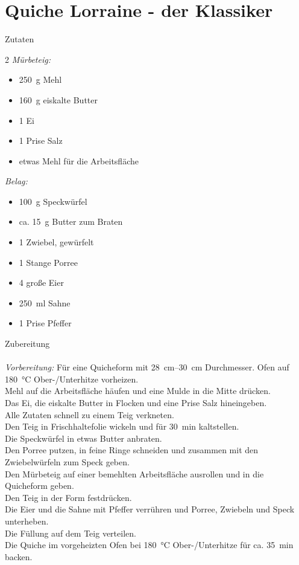 
\section*{Quiche Lorraine - der Klassiker}
\ihead{}\ohead{}
\cfoot{}
{\Large Zutaten}
\begin{multicols}{2}
\textit{Mürbeteig:}
\begin{itemize}
    \item \SI{250}{g} Mehl
    \item \SI{160}{g} eiskalte Butter
    \item \num{1} Ei
    \item \num{1} Prise Salz
    \item etwas Mehl für die Arbeitsfläche
\end{itemize}
\textit{Belag:}
\begin{itemize}
    \item \SI{100}{g} Speckwürfel
    \item ca. \SI{15}{g} Butter zum Braten
    \item \num{1} Zwiebel, gewürfelt
    \item \num{1} Stange Porree
    \item \num{4} große Eier
    \item \SI{250}{ml} Sahne
    \item \num{1} Prise Pfeffer
\end{itemize}
\end{multicols}
\noindent
{\Large Zubereitung}\\
\\
\textit{Vorbereitung:} Für eine Quicheform mit \SIrange{28}{30}{cm} Durchmesser. Ofen auf \SI{180}{\celsius} Ober-/Unterhitze vorheizen.\\
Mehl auf die Arbeitsfläche häufen und eine Mulde in die Mitte drücken.\\
Das Ei, die eiskalte Butter in Flocken und eine Prise Salz hineingeben.\\
Alle Zutaten schnell zu einem Teig verkneten.\\
Den Teig in Frischhaltefolie wickeln und für \SI{30}{min} kaltstellen.\\
Die Speckwürfel in etwas Butter anbraten.\\
Den Porree putzen, in feine Ringe schneiden und zusammen mit den Zwiebelwürfeln zum Speck geben.\\
Den Mürbeteig auf einer bemehlten Arbeitsfläche ausrollen und in die Quicheform geben.\\
Den Teig in der Form festdrücken.\\
Die Eier und die Sahne mit Pfeffer verrühren und Porree, Zwiebeln und Speck unterheben.\\
Die Füllung auf dem Teig verteilen.\\
Die Quiche im vorgeheizten Ofen bei \SI{180}{\celsius} Ober-/Unterhitze für ca. \SI{35}{min} backen.
